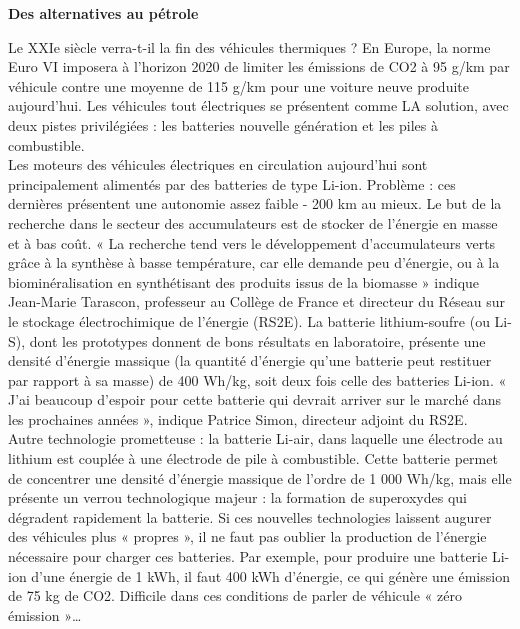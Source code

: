 \documentclass[8pt]{article}
\begin{document}
\textbf{Des alternatives au pétrole}

Le XXIe siècle verra-t-il la fin des véhicules thermiques ? En Europe, la norme Euro VI imposera à l’horizon 2020 de limiter les émissions de CO2 à 95 g/km par véhicule contre une moyenne de 115 g/km pour une voiture neuve produite aujourd’hui. Les véhicules tout électriques se présentent comme LA solution, avec deux pistes privilégiées : les batteries nouvelle génération et les piles à combustible.\\

Les moteurs des véhicules électriques en circulation aujourd’hui sont principalement alimentés par des batteries de type Li-ion. Problème : ces dernières présentent une autonomie assez faible - 200 km au mieux. Le but de la recherche dans le secteur des accumulateurs est de stocker de l’énergie en masse et à bas coût. « La recherche tend vers le développement d’accumulateurs verts grâce à la synthèse à basse température, car elle demande peu d’énergie, ou à la biominéralisation en synthétisant des produits issus de la biomasse » indique Jean-Marie Tarascon, professeur au Collège de France et directeur du Réseau sur le stockage électrochimique de l’énergie (RS2E). La batterie lithium-soufre (ou Li-S), dont les prototypes donnent de bons résultats en laboratoire, présente une densité d’énergie massique (la quantité d'énergie qu'une batterie peut restituer par rapport à sa masse) de 400 Wh/kg, soit deux fois celle des batteries Li-ion. « J’ai beaucoup d’espoir pour cette batterie qui devrait arriver sur le marché dans les prochaines années », indique Patrice Simon, directeur adjoint du RS2E.\\

Autre technologie prometteuse : la batterie Li-air, dans laquelle une électrode au lithium est couplée à une électrode de pile à combustible. Cette batterie permet de concentrer une densité d’énergie massique de l’ordre de 1 000 Wh/kg, mais elle présente un verrou technologique majeur : la formation de superoxydes qui dégradent rapidement la batterie. Si ces nouvelles technologies laissent augurer des véhicules plus « propres », il ne faut pas oublier la production de l’énergie nécessaire pour charger ces batteries. Par exemple, pour produire une batterie Li-ion d'une énergie de 1 kWh, il faut 400 kWh d'énergie, ce qui génère une émission de 75 kg de CO2. Difficile dans ces conditions de parler de véhicule « zéro émission »…\\
\end{document}

